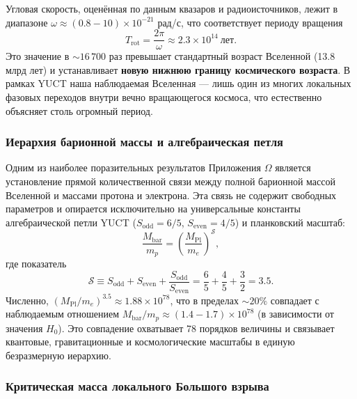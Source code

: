 \documentclass[12pt,a4paper]{article}
\begin{document}
Угловая скорость, оценённая по данным квазаров и радиоисточников, лежит в диапазоне $\omega \approx (0.8-10)\times 10^{-21}$ рад/с, что соответствует периоду вращения
\begin{equation}
	T_{\mathrm{rot}} = \frac{2\pi}{\omega} \approx 2.3 \times 10^{14}\ \text{лет}.
\end{equation}
Это значение в $\sim 16\,700$ раз превышает стандартный возраст Вселенной (13.8 млрд лет) и устанавливает \textbf{новую нижнюю границу космического возраста}. В рамках YUCT наша наблюдаемая Вселенная — лишь один из многих локальных фазовых переходов внутри вечно вращающегося космоса, что естественно объясняет столь огромный период.

\subsubsection{Иерархия барионной массы и алгебраическая петля}

Одним из наиболее поразительных результатов Приложения $\Omega$ является установление прямой количественной связи между полной барионной массой Вселенной и массами протона и электрона. Эта связь не содержит свободных параметров и опирается исключительно на универсальные константы алгебраической петли YUCT ($S_{\mathrm{odd}}=6/5$, $S_{\mathrm{even}}=4/5$) и планковский масштаб:
\begin{equation}
	\boxed{ \frac{M_{\mathrm{bar}}}{m_p} = \left( \frac{M_{\mathrm{Pl}}}{m_e} \right)^{\mathcal{S}} },
	\label{eq:baryon_hierarchy_combined}
\end{equation}
где показатель
\begin{equation}
	\mathcal{S} \equiv S_{\mathrm{odd}} + S_{\mathrm{even}} + \frac{S_{\mathrm{odd}}}{S_{\mathrm{even}}} = \frac{6}{5} + \frac{4}{5} + \frac{3}{2} = 3.5.
\end{equation}
Численно, $(M_{\mathrm{Pl}}/m_e)^{3.5} \approx 1.88 \times 10^{78}$, что в пределах $\sim 20\%$ совпадает с наблюдаемым отношением $M_{\mathrm{bar}}/m_p \approx (1.4-1.7) \times 10^{78}$ (в зависимости от значения $H_0$). Это совпадение охватывает 78 порядков величины и связывает квантовые, гравитационные и космологические масштабы в единую безразмерную иерархию.

\subsubsection{Критическая масса локального Большого взрыва}
\end{document}
